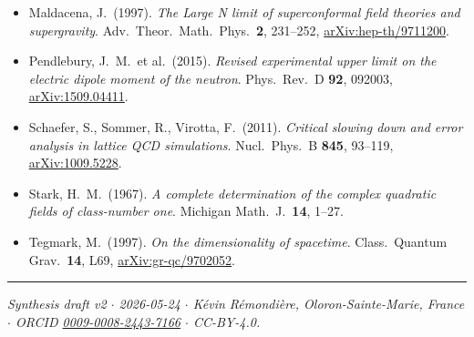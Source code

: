 \documentclass[11pt,a4paper]{article}
\begin{document}
\begin{itemize}[leftmargin=*,itemsep=2pt]
  \item Maldacena, J.\ (1997). \emph{The Large N limit of superconformal field theories and supergravity}. Adv.\ Theor.\ Math.\ Phys.\ \textbf{2}, 231--252, \href{https://arxiv.org/abs/hep-th/9711200}{arXiv:hep-th/9711200}.
  \item Pendlebury, J.~M.\ et al.\ (2015). \emph{Revised experimental upper limit on the electric dipole moment of the neutron}. Phys.\ Rev.\ D \textbf{92}, 092003, \href{https://arxiv.org/abs/1509.04411}{arXiv:1509.04411}.
  \item Schaefer, S., Sommer, R., Virotta, F.\ (2011). \emph{Critical slowing down and error analysis in lattice QCD simulations}. Nucl.\ Phys.\ B \textbf{845}, 93--119, \href{https://arxiv.org/abs/1009.5228}{arXiv:1009.5228}.
  \item Stark, H.~M.\ (1967). \emph{A complete determination of the complex quadratic fields of class-number one}. Michigan Math.\ J.\ \textbf{14}, 1--27.
  \item Tegmark, M.\ (1997). \emph{On the dimensionality of spacetime}. Class.\ Quantum Grav.\ \textbf{14}, L69, \href{https://arxiv.org/abs/gr-qc/9702052}{arXiv:gr-qc/9702052}.
\end{itemize}

\bigskip

\hrule

\bigskip

\emph{Synthesis draft v2 $\cdot$ 2026-05-24 $\cdot$ Kévin Rémondière, Oloron-Sainte-Marie, France $\cdot$ ORCID \href{https://orcid.org/0009-0008-2443-7166}{0009-0008-2443-7166} $\cdot$ CC-BY-4.0.}
\end{document}
